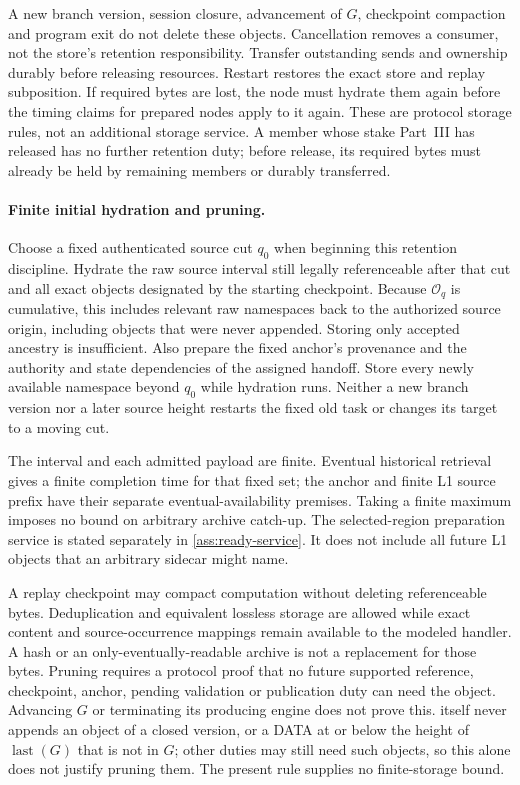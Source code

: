 \documentclass[11pt,a4paper]{article}
\newcounter{protocol}
\begin{document}
A new branch version, session closure, advancement of $G$, checkpoint
compaction and program exit do not delete these objects. Cancellation
removes a consumer, not the store's retention responsibility. Transfer
outstanding sends and ownership durably before releasing resources.
Restart restores the exact store and replay subposition. If required
bytes are lost, the node must hydrate them again before the timing
claims for prepared nodes apply to it again.
These are protocol storage rules, not an additional storage service.
A member whose stake Part~III has released has no further retention
duty; before release, its required bytes must already be held by
remaining members or durably transferred.

\paragraph{Finite initial hydration and pruning.}
\label{sec:source-hydration}
Choose a fixed authenticated source cut $q_0$ when beginning this
retention discipline. Hydrate the raw source interval still legally
referenceable after that cut and all exact objects designated by the
starting checkpoint. Because $\mathcal O_q$ is cumulative, this
includes relevant raw namespaces back to the authorized source origin,
including objects that were never appended. Storing only accepted
ancestry is insufficient. Also prepare the fixed anchor's provenance and the
authority and state dependencies of the assigned handoff.
Store every newly available namespace beyond $q_0$ while hydration
runs. Neither a new branch version nor a later source height restarts the fixed
old task or changes its target to a moving cut.

The interval and each admitted payload are finite. Eventual historical
retrieval gives a finite completion time for that fixed set; the anchor
and finite L1 source prefix have their separate eventual-availability
premises. Taking a finite maximum imposes no bound on arbitrary archive catch-up.
The selected-region preparation service is stated separately in
\cref{ass:ready-service}. It does not include all future
L1 objects that an arbitrary sidecar might name.

A replay checkpoint may compact computation without deleting
referenceable bytes. Deduplication and equivalent lossless storage are
allowed while exact content and source-occurrence mappings remain
available to the modeled handler. A hash or an only-eventually-readable
archive is not a replacement for those bytes. Pruning requires a
protocol proof that no future supported reference, checkpoint,
anchor, pending validation or publication duty can need the object.
Advancing $G$ or terminating its producing engine does not prove this.
 itself never appends an object of a closed
version, or a DATA at or below the height of $\operatorname{last}(G)$
that is not in $G$; other duties may still need such objects, so this
alone does not justify pruning them.
The present rule supplies no finite-storage bound.
\end{document}
